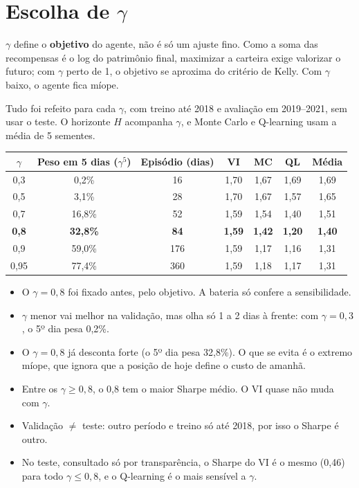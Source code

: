 \documentclass[11pt,a4paper]{article}
\newcommand{\bloco}[1]{\par\needspace{4\baselineskip}{\bfseries #1}\par\nopagebreak}
\begin{document}
\section{Escolha de \texorpdfstring{$\gamma$}{gama}}
\label{sec:gamma}

$\gamma$ define o \textbf{objetivo} do agente, não é só um ajuste fino. Como a soma das recompensas é o log do patrimônio final, maximizar a carteira exige valorizar o futuro; com $\gamma$ perto de 1, o objetivo se aproxima do critério de Kelly. Com $\gamma$ baixo, o agente fica míope.

\bloco{A bateria de validação}
Tudo foi refeito para cada $\gamma$, com treino até 2018 e avaliação em 2019--2021, sem usar o teste. O horizonte $H$ acompanha $\gamma$, e Monte Carlo e Q-learning usam a média de 5 sementes.

\begin{center}
\small
\begin{tabular}{c c c cccc}
  \toprule
  $\gamma$ & Peso em 5 dias ($\gamma^5$) & Episódio (dias) & VI & MC & QL & Média \\
  \midrule
  0,3  & 0,2\%  & 16  & 1,70 & 1,67 & 1,69 & 1,69 \\
  0,5  & 3,1\%  & 28  & 1,70 & 1,67 & 1,57 & 1,65 \\
  0,7  & 16,8\% & 52  & 1,59 & 1,54 & 1,40 & 1,51 \\
  \midrule
  \textbf{0,8} & \textbf{32,8\%} & \textbf{84} & \textbf{1,59} & \textbf{1,42} & \textbf{1,20} & \textbf{1,40} \\
  0,9  & 59,0\% & 176 & 1,59 & 1,17 & 1,16 & 1,31 \\
  0,95 & 77,4\% & 360 & 1,59 & 1,18 & 1,17 & 1,31 \\
  \bottomrule
\end{tabular}
\end{center}

\begin{defesa}
\begin{itemize}
  \item O $\gamma = 0{,}8$ foi fixado antes, pelo objetivo. A bateria só confere a sensibilidade.
  \item $\gamma$ menor vai melhor na validação, mas olha só 1 a 2 dias à frente: com $\gamma = 0{,}3$, o 5º dia pesa 0,2\%.
  \item O $\gamma = 0{,}8$ já desconta forte (o 5º dia pesa 32,8\%). O que se evita é o extremo míope, que ignora que a posição de hoje define o custo de amanhã.
  \item Entre os $\gamma \ge 0{,}8$, o 0,8 tem o maior Sharpe médio. O VI quase não muda com $\gamma$.
  \item Validação $\neq$ teste: outro período e treino só até 2018, por isso o Sharpe é outro.
  \item No teste, consultado só por transparência, o Sharpe do VI é o mesmo (0,46) para todo $\gamma \le 0{,}8$, e o Q-learning é o mais sensível a $\gamma$.
\end{itemize}
\end{defesa}
\end{document}
